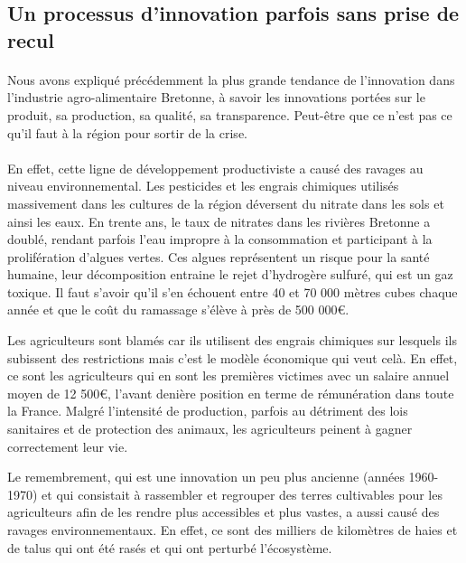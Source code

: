 \documentclass[a4paper,12pt]{report}
\begin{document}
		\subsection{Un processus d'innovation parfois sans prise de recul}
			
			\paragraph{}Nous avons expliqué précédemment la plus grande tendance de l’innovation dans l’industrie agro-alimentaire Bretonne, à savoir les innovations portées sur le produit, sa production, sa qualité, sa transparence. Peut-être que ce n’est pas ce qu’il faut à la région pour sortir de la crise.
			
			\paragraph{}En effet, cette ligne de développement productiviste a causé des ravages au niveau environnemental. Les pesticides et les engrais chimiques utilisés massivement dans les cultures de la région déversent du nitrate dans les sols et ainsi les eaux. En trente ans, le taux de nitrates dans les rivières Bretonne a doublé, rendant parfois l’eau impropre à la consommation et participant à la prolifération d’algues vertes\cite{NitratesAlguesVertesBretagne}. Ces algues représentent un risque pour la santé humaine, leur décomposition entraine le rejet d’hydrogère sulfuré, qui est un gaz toxique. Il faut s’avoir qu’il s’en échouent entre 40 et 70 000 mètres cubes chaque année et que le coût du ramassage s’élève à près de 500 000€.
			
			Les agriculteurs sont blamés car ils utilisent des engrais chimiques sur lesquels ils subissent des restrictions mais c’est le modèle économique qui veut celà. En effet, ce sont les agriculteurs qui en sont les premières victimes avec un salaire annuel moyen de 12 500\euro, l’avant denière position en terme de rémunération dans toute la France\cite{AlguesVertesNouvellePreuveRavagesProductivismeAgricole}. Malgré l’intensité de production, parfois au détriment des lois sanitaires et de protection des animaux, les agriculteurs peinent à gagner correctement leur vie.
			
			
			Le remembrement, qui est une innovation un peu plus ancienne (années 1960-1970) et qui consistait à rassembler et regrouper des terres cultivables pour les agriculteurs afin de les rendre plus accessibles et plus vastes, a aussi causé des ravages environnementaux. En effet, ce sont des milliers de kilomètres de haies et de talus qui ont été rasés et qui ont perturbé l’écosystème.
			
\end{document}
